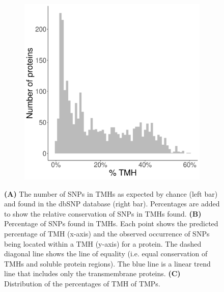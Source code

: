 \begin{figure}
   \vfill

  \begin{subfigure}[t]{0.45\textwidth}
    \centering
    \caption{}
    \includegraphics[width=\linewidth]{ncbi_peregrine_results/fig_f_tmh_ncbi.png}
    \label{fig:f_tmh_ncbi}
  \end{subfigure}  


  \caption{
    \textbf{(A)} 
    The number of SNPs in TMHs as expected by chance (left bar) 
    and found in the dbSNP database (right bar).
    Percentages are added to show the relative conservation
    of SNPs in TMHs found.
    \textbf{(B)}
    Percentage of SNPs found in TMHs.
    Each point shows the predicted percentage of
    TMH (x-axis) and the observed occurrence of SNPs being located
    within a TMH (y-axis) for a protein.
    The dashed diagonal line shows the line of equality (i.e.
    equal conservation of TMHs and soluble protein regions).
    The blue line is a linear trend line that includes only the
    transmembrane proteins.
    \textbf{(C)}
    Distribution of the percentages of TMH of TMPs.
  }
\end{figure}

